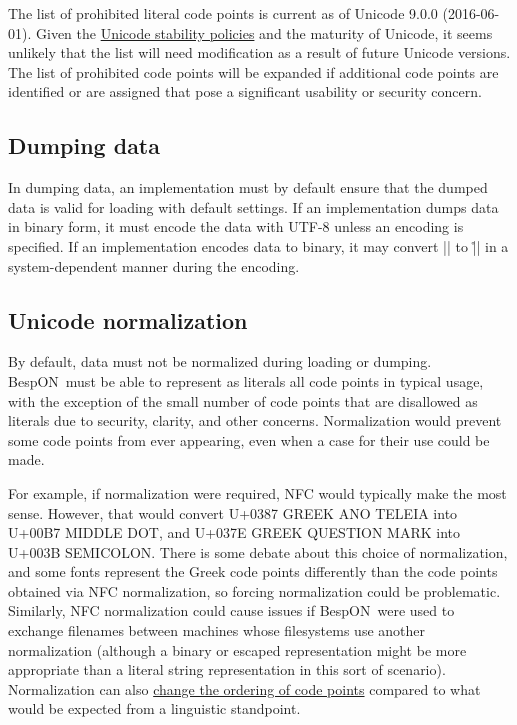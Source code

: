 \documentclass[11pt]{article}
\newcommand{\bespon}{BespON}
\begin{document}
The list of prohibited literal code points is current as of Unicode 9.0.0 (2016-06-01).  Given the \href{http://unicode.org/policies/stability_policy.html}{Unicode stability policies} and the maturity of Unicode, it seems unlikely that the list will need modification as a result of future Unicode versions.  The list of prohibited code points will be expanded if additional code points are identified or are assigned that pose a significant usability or security concern.

\subsection{Dumping data}

In dumping data, an implementation must by default ensure that the dumped data is valid for loading with default settings.  If an implementation dumps data in binary form, it must encode the data with UTF-8 unless an encoding is specified.  If an implementation encodes data to binary, it may convert |\n| to |\r\n| in a system-dependent manner during the encoding.


\subsection{Unicode normalization}

By default, data must not be normalized during loading or dumping.  \bespon\ must be able to represent as literals all code points in typical usage, with the exception of the small number of code points that are disallowed as literals due to security, clarity, and other concerns.  Normalization would prevent some code points from ever appearing, even when a case for their use could be made.

For example, if normalization were required, NFC would typically make the most sense.  However, that would convert U+0387 GREEK ANO TELEIA into U+00B7 MIDDLE DOT, and U+037E GREEK QUESTION MARK into U+003B SEMICOLON.  There is some debate about this choice of normalization, and some fonts represent the Greek code points differently than the code points obtained via NFC normalization, so forcing normalization could be problematic.  Similarly, NFC normalization could cause issues if \bespon\ were used to exchange filenames between machines whose filesystems use another normalization (although a binary or escaped representation might be more appropriate than a literal string representation in this sort of scenario).  Normalization can also \href{http://unicode.org/faq/normalization.html}{change the ordering of code points} compared to what would be expected from a linguistic standpoint.
\end{document}
